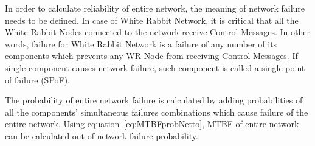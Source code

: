 In order to calculate reliability of entire network, the meaning of network 
failure needs to be defined. In case of White Rabbit Network, it is critical 
that all the White Rabbit Nodes connected to the network receive Control 
Messages. In other words, failure for White Rabbit Network is a failure of any 
number of its components which prevents any WR Node from receiving Control 
Messages. If single component causes network failure, such component is called 
a single point of failure (SPoF).

The probability of entire network failure is calculated by adding probabilities
of all the components' simultaneous failures combinations which cause failure of
the entire network. 
Using equation~\ref{eq:MTBFprobNetto}, MTBF of entire network can be calculated 
out of network failure probability.
